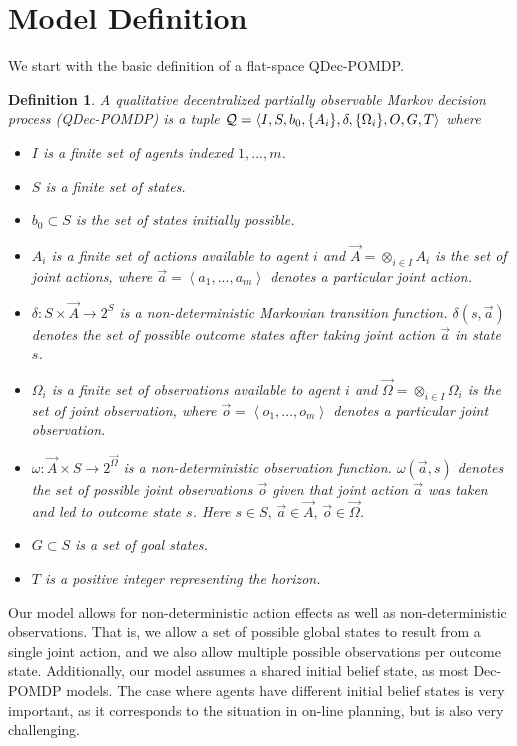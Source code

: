 \documentclass[letterpaper]{article}
\newtheorem{definition}{Definition}
\newcommand{\tuple}[1]{\ensuremath{\left \langle  #1 \right \rangle }}
\theoremstyle{definition}
\begin{document}
\section{Model Definition}
We start with the basic definition of a flat-space QDec-POMDP.
\begin{definition} A qualitative decentralized partially observable Markov decision process
(QDec-POMDP) is a tuple ${\cal Q} = \langle  I, S, b_0,\{A_i\}, \delta, \{\Omega_i\}, O, G, T\rangle$
where
\begin{itemize}
\setlength{\itemsep}{-1pt}
\item $I$ is a finite set of agents indexed $1,...,m$.

\item $S$ is a finite set of states.

\item$b_0 \subset S$ is the set of states initially possible.

\item $A_i$ is a finite set of actions available to agent $i$ and
$\vec{A} = \otimes_{i \in I} A_i$ is the set of joint actions, where
$\vec{a} = \tuple{a_1,...,a_m}$ denotes a particular joint action.

\item $\delta: S \times \vec{A} \rightarrow 2^S$ is a non-deterministic Markovian transition function. $\delta(s, \vec{a})
$ denotes the set of possible outcome states after taking joint action $\vec{a}$ in state $s$.

\item $\Omega_i$ is a finite set of observations available to agent $i$ and
$\vec{\Omega} = \otimes_{i \in I} \Omega_i$ is the set of joint
observation, where $\vec{o} = \tuple{o_1,...,o_m}$ denotes a particular joint
observation.

\item $\omega : \vec{A} \times S \rightarrow 2^{\vec{\Omega}}$ is a {\em non-deterministic\/} observation function. $\omega(\vec{a}, s)$
denotes the set of possible joint observations $\vec{o}$ given that
joint action $\vec{a}$ was taken and led to outcome state $s$. Here $s \in S,\, \vec{a}
\in \vec{A},\, \vec{o} \in \vec{\Omega}$.

\item $G \subset S$ is a set of goal states.

\item $T$ is a positive integer representing the horizon.

\end{itemize}
\label{11_def:DEC-POMDP}
\end{definition}
Our model allows for non-deterministic action effects as well as non-deterministic observations. That is, we allow a set of possible global states to result from a single joint action, and we also allow multiple possible observations per outcome state.
Additionally, our model assumes a shared initial belief state, as most Dec-POMDP models. The case where agents have different initial belief states is very important, as it corresponds to the situation in on-line planning, but is also very challenging.
\end{document}
